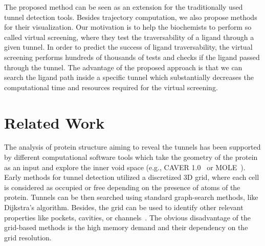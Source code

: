 \documentclass{svmult}
\begin{document}
The proposed method can be seen as an extension for the traditionally used tunnel detection tools.
Besides trajectory computation, we also propose methods for their visualization.
Our motivation is to help the biochemists to perform so called virtual screening, where they test the traversability of a ligand through a given tunnel.
In order to predict the success of ligand traversability, the virtual screening performs hundreds of thousands of tests and checks if the ligand passed through the tunnel.
The advantage of the proposed approach is that we can search the ligand path inside a specific tunnel which substantially decreases the computational time and resources required for the virtual screening.


\section{Related Work}


The analysis of protein structure aiming to reveal the tunnels has been supported by different computational software tools which take the geometry of the protein as an input and explore the inner void space (e.g., CAVER 1.0~\cite{petrek2006caver} or MOLE~\cite{Petrek20071357}). 
Early methods for tunnel detection utilized a discretized 3D grid, where each cell is considered as occupied or free depending
on the presence of atoms of the protein.
Tunnels can be then searched using standard graph-search methods, like Dijkstra's algorithm.
Besides, the grid can be used to identify other relevant properties like 
pockets, cavities, or channels~\cite{sehnal2013mole,petrek2006caver}.
The obvious disadvantage of the grid-based methods is the high memory demand and their dependency on the grid resolution.
\end{document}
